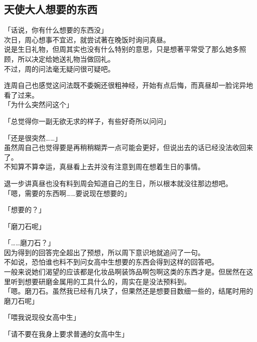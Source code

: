 \subsection{天使大人想要的东西}

「话说，你有什么想要的东西没」\\

次日，周心想事不宜迟，就尝试著在晚饭时询问真昼。\\

说是生日礼物，但周其实也没有什么特别的意思，只是想著平常受了那么她多照顾，所以决定给她送礼物当做回礼。\\

不过，周的问法毫无疑问很可疑吧。

连周自己也感觉这问法既不委婉还很粗神经，开始有点后悔，而真昼却一脸诧异地看了过来。\\

「为什么突然问这个」

「总觉得你一副无欲无求的样子，有些好奇所以问问」

「还是很突然……」\\

虽然周自己也觉得要是再稍稍糊弄一点可能会更好，但说出去的话已经没法收回来了。\\

不知算不算幸运，真昼看上去并没有注意到周在想着生日的事情。

退一步讲真昼也没有料到周会知道自己的生日，所以根本就没往那边想吧。\\

「嗯，需要的东西啊……要说现在想要的」

「想要的？」

「磨刀石呢」

「……磨刀石？」\\

因为得到的回答完全超出了预想，所以周下意识地就追问了一句。\\

不如说，恐怕谁也料不到问女高中生想要的东西会得到这样的回答吧。\\

一般来说她们渴望的应该都是化妆品啊装饰品啊包啊这类的东西才是。但居然在这里听到想要研磨金属用的工具什么的，周实在是没法预料到。\\

「嗯。磨刀石。虽然我已经有几块了，但果然还是想要目数细一些的，结尾时用的磨刀石呢」%

「喂我说现役女高中生」

「请不要在我身上要求普通的女高中生」\\

